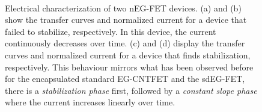 \begin{figure}
    \centering
    \hfill
     \\
    \hfill
    \caption{Electrical characterization of two nEG-FET devices. 
    (a) and (b) show the transfer curves and normalized current for a device that failed to stabilize, respectively. In this device, the current continuously decreases over time.
    (c) and (d) display the transfer curves and normalized current for a device that finds stabilization, respectively. This behaviour mirrors what has been observed before for the encapsulated standard EG-CNTFET and the sdEG-FET, \ie{} there is a \emph{stabilization phase} first, followed by a \emph{constant slope phase} where the current increases linearly over time.
    }
    \label{fig:nEGFETData}
\end{figure}


